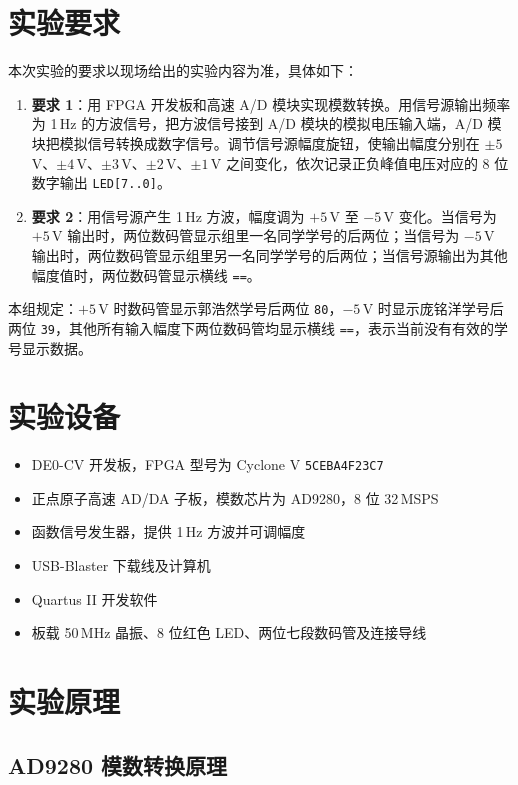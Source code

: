 \documentclass[12pt]{ctexart}
\begin{document}
\section{实验要求}

本次实验的要求以现场给出的实验内容为准，具体如下：

\begin{enumerate}
    \item \textbf{要求 1}：用 FPGA 开发板和高速 A/D 模块实现模数转换。用信号源输出频率为 1\,Hz 的方波信号，把方波信号接到 A/D 模块的模拟电压输入端，A/D 模块把模拟信号转换成数字信号。调节信号源幅度旋钮，使输出幅度分别在 $\pm5\,$V、$\pm4\,$V、$\pm3\,$V、$\pm2\,$V、$\pm1\,$V 之间变化，依次记录正负峰值电压对应的 8 位数字输出 \texttt{LED[7..0]}。
    \item \textbf{要求 2}：用信号源产生 1\,Hz 方波，幅度调为 $+5\,$V 至 $-5\,$V 变化。当信号为 $+5\,$V 输出时，两位数码管显示组里一名同学学号的后两位；当信号为 $-5\,$V 输出时，两位数码管显示组里另一名同学学号的后两位；当信号源输出为其他幅度值时，两位数码管显示横线 \texttt{==}。
\end{enumerate}

本组规定：$+5\,$V 时数码管显示郭浩然学号后两位 \texttt{80}，$-5\,$V 时显示庞铭洋学号后两位 \texttt{39}，其他所有输入幅度下两位数码管均显示横线 \texttt{==}，表示当前没有有效的学号显示数据。

\section{实验设备}

\begin{itemize}
    \item DE0-CV 开发板，FPGA 型号为 Cyclone V \texttt{5CEBA4F23C7}
    \item 正点原子高速 AD/DA 子板，模数芯片为 AD9280，8 位 32\,MSPS
    \item 函数信号发生器，提供 1\,Hz 方波并可调幅度
    \item USB-Blaster 下载线及计算机
    \item Quartus II 开发软件
    \item 板载 50\,MHz 晶振、8 位红色 LED、两位七段数码管及连接导线
\end{itemize}

\section{实验原理}

\subsection{AD9280 模数转换原理}
\end{document}
